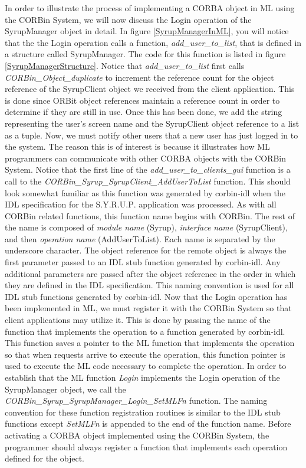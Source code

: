 In order to illustrate the process of implementing a CORBA object in ML using 
the CORBin System, we will now discuss the Login operation of the SyrupManager 
object in detail.  In figure \ref{SyrupManagerInML}, you will notice that the 
the Login operation calls a function, {\em{add\_user\_to\_list}}, that is 
defined in a structure called SyrupManager.
The code for this function is listed in figure \ref{SyrupManagerStructure}.   
Notice that {\em{add\_user\_to\_list}} first calls {\em{CORBin\_Object\_duplicate}} 
to increment the reference count for the object reference of the SyrupClient 
object we received from the client application.  This is done since ORBit 
object references maintain a reference count in order to determine if they are 
still in use.   Once this has been done, we add the string representing the 
user's screen name and the SyrupClient object reference to a list as a tuple.  
Now, we must notify other users that a new user has just logged in to the system. 
The reason this is of interest is because it illustrates how ML programmers can 
communicate with other CORBA objects with the CORBin System.  Notice that the 
first line of the {\em{add\_user\_to\_clients\_gui}} function is a call to the 
{\em{CORBin\_Syrup\_SyrupClient\_AddUser\-ToList}} function.  This should look somewhat
familiar as this function was generated by corbin-idl when the IDL specification
for the S$.$Y$.$R$.$U$.$P$.$ application was processed.  As with all CORBin related 
functions, this function name begins with CORBin.  The rest of the name is composed 
of {\em{module name}} (Syrup), {\em{interface name}} (SyrupClient), and 
then {\em{operation name}} (AddUserToList).  Each name is separated by the underscore
character.  The object reference for the remote object is always the first parameter
passed to an IDL stub function generated by corbin-idl. Any additional parameters 
are passed after the object reference in the order in which they are defined in the 
IDL specification.   This naming convention is used for all IDL stub functions 
generated by corbin-idl.  Now that the Login operation has been implemented in ML, 
we must register it with the CORBin System so that client applications may utilize it.
This is done by passing the name of the function that implements the operation to 
a function generated by corbin-idl.  This function saves a pointer to the ML function 
that implements the operation so that when requests arrive to execute the operation, 
this function pointer is used to execute the ML code necessary to complete the operation.   
In order to establish that the ML function {\em{Login}} implements the Login operation
of the SyrupManager object, we call the {\em{CORBin\_Syrup\_SyrupManager\_Login\_SetMLFn}}
function. The naming convention for these function registration routines is similar 
to the IDL stub functions except {\em{SetMLFn}} is appended to the end of the function 
name.  Before activating a CORBA object implemented using the CORBin System, 
the programmer should always register a function that implements each operation 
defined for the object. 


